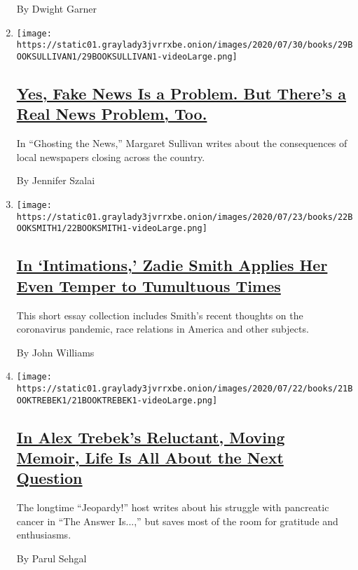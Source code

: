 \begin{enumerate}
  By Dwight Garner
\item
  \texttt{[image: https://static01.graylady3jvrrxbe.onion/images/2020/07/30/books/29BOOKSULLIVAN1/29BOOKSULLIVAN1-videoLarge.png]}

  \hypertarget{yes-fake-news-is-a-problem-but-theres-a-real-news-problem-too}{%
  \subsection{\texorpdfstring{\href{/2020/07/26/books/review-ghosting-news-local-journalism-democracy-crisis-margaret-sullivan.html}{Yes,
  Fake News Is a Problem. But There's a Real News Problem,
  Too.}}{Yes, Fake News Is a Problem. But There's a Real News Problem, Too.}}\label{yes-fake-news-is-a-problem-but-theres-a-real-news-problem-too}}

  In ``Ghosting the News,'' Margaret Sullivan writes about the
  consequences of local newspapers closing across the country.

  By Jennifer Szalai
\item
  \texttt{[image: https://static01.graylady3jvrrxbe.onion/images/2020/07/23/books/22BOOKSMITH1/22BOOKSMITH1-videoLarge.png]}

  \hypertarget{in-intimations-zadie-smith-applies-her-even-temper-to-tumultuous-times}{%
  \subsection{\texorpdfstring{\href{/2020/07/22/books/review-intimations-essays-zadie-smith.html}{In
  `Intimations,' Zadie Smith Applies Her Even Temper to Tumultuous
  Times}}{In `Intimations,' Zadie Smith Applies Her Even Temper to Tumultuous Times}}\label{in-intimations-zadie-smith-applies-her-even-temper-to-tumultuous-times}}

  This short essay collection includes Smith's recent thoughts on the
  coronavirus pandemic, race relations in America and other subjects.

  By John Williams
\item
  \texttt{[image: https://static01.graylady3jvrrxbe.onion/images/2020/07/22/books/21BOOKTREBEK1/21BOOKTREBEK1-videoLarge.png]}

  \hypertarget{in-alex-trebeks-reluctant-moving-memoir-life-is-all-about-the-next-question}{%
  \subsection{\texorpdfstring{\href{/2020/07/21/books/review-answer-is-alex-trebek-jeopardy-memoir.html}{In
  Alex Trebek's Reluctant, Moving Memoir, Life Is All About the Next
  Question}}{In Alex Trebek's Reluctant, Moving Memoir, Life Is All About the Next Question}}\label{in-alex-trebeks-reluctant-moving-memoir-life-is-all-about-the-next-question}}

  The longtime ``Jeopardy!'' host writes about his struggle with
  pancreatic cancer in ``The Answer Is...,'' but saves most of the room
  for gratitude and enthusiasms.

  By Parul Sehgal
\end{enumerate}

